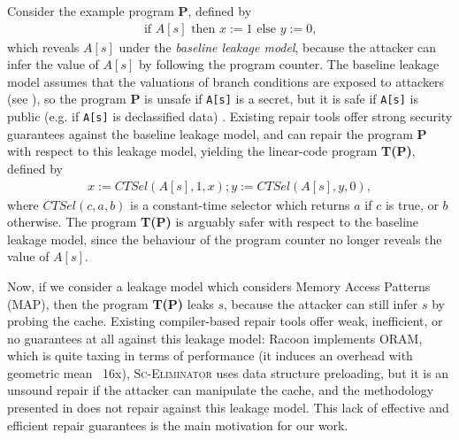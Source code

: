 Consider the example program \textbf{P}, defined by%
    \begin{align*}
        \text{if $A[s]$ then $x:=1$ else $y:=0$,}
    \end{align*}
which reveals $A[s]$ under the \emph{baseline leakage model}, because the attacker can infer the value of $A[s]$ by following the program counter. The baseline leakage model assumes that the valuations of branch conditions are exposed to attackers (see \cite[\S3, Example 1]{usenix_ctp_verification}), so the program \textbf{P} is unsafe if \texttt{A[s]} is a secret, but it is safe if \texttt{A[s]} is public (e.g. if \texttt{A[s]} is declassified data)%
. Existing repair tools \cite{SCEliminator,MSESC,Racoon} offer strong security guarantees against the baseline leakage model, and can repair the program \textbf{P} with respect to this leakage model, yielding the linear-code program \textbf{T(P)}, defined by
\begin{align*}
    x:=CTSel(A[s],1,x);y:=CTSel(A[s],y,0),
\end{align*}
where $CTSel(c,a,b)$ is a constant-time selector which returns $a$ if $c$ is true, or $b$ otherwise. The program \textbf{T(P)} is arguably safer with respect to the baseline leakage model, since the behaviour of the program counter no longer reveals the value of $A[s]$. 

Now, if we consider a leakage model which considers Memory Access Patterns (MAP), then the program \textbf{T(P)} leaks $s$, because the attacker can still infer $s$ by probing the cache. 
Existing compiler-based repair tools \cite{SCEliminator,MSESC,Racoon} offer weak, inefficient, or no guarantees at all against this leakage model: Racoon \cite{Racoon} implements ORAM, which is quite taxing in terms of performance (it induces an overhead with geometric mean ~16x), \textsc{Sc-Eliminator} uses data structure preloading, but it is an unsound repair if the attacker can manipulate the cache, and the methodology presented in \cite{MSESC} does not repair against this leakage model. %
This lack of effective and efficient repair guarantees is the main motivation for our work. 

